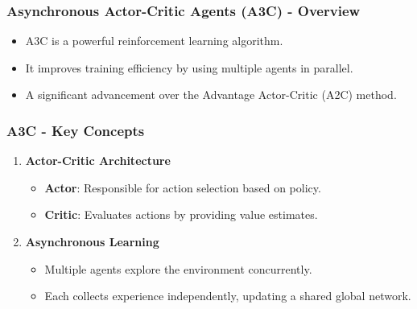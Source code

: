 \documentclass{beamer}
\begin{document}
\begin{frame}[fragile]
    \frametitle{Asynchronous Actor-Critic Agents (A3C) - Overview}
    \begin{itemize}
        \item A3C is a powerful reinforcement learning algorithm.
        \item It improves training efficiency by using multiple agents in parallel.
        \item A significant advancement over the Advantage Actor-Critic (A2C) method.
    \end{itemize}
\end{frame}

\begin{frame}[fragile]
    \frametitle{A3C - Key Concepts}
    \begin{enumerate}
        \item \textbf{Actor-Critic Architecture}
            \begin{itemize}
                \item \textbf{Actor}: Responsible for action selection based on policy.
                \item \textbf{Critic}: Evaluates actions by providing value estimates.
            \end{itemize}
        \item \textbf{Asynchronous Learning}
            \begin{itemize}
                \item Multiple agents explore the environment concurrently.
                \item Each collects experience independently, updating a shared global network.
            \end{itemize}
    \end{enumerate}
\end{frame}
\end{document}

